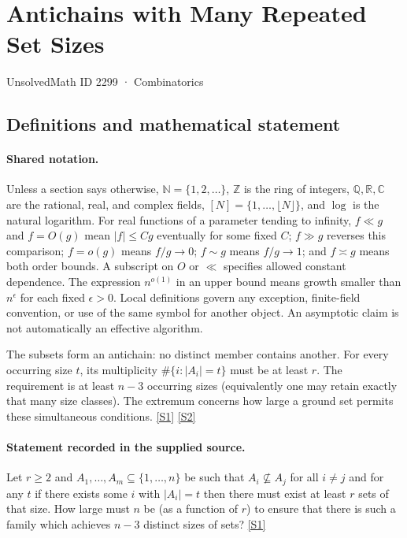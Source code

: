 \documentclass[11pt,a4paper]{article}
\newcommand{\N}{\mathbb{N}}
\newcommand{\Z}{\mathbb{Z}}
\newcommand{\Q}{\mathbb{Q}}
\newcommand{\R}{\mathbb{R}}
\newcommand{\C}{\mathbb{C}}
\newcommand{\sref}[2]{\hyperlink{source:#1:#2}{[S#2]}}
\begin{document}

\setcounter{section}{2298}

\section{Antichains with Many Repeated Set Sizes}\label{2299}

{\small\sffamily UnsolvedMath ID 2299 · Combinatorics}

\subsection{Definitions and mathematical statement}

\paragraph{Shared notation.}Unless a section says otherwise, $\N=\{1,2,\ldots\}$,
$\Z$ is the ring of integers, $\Q,\R,\C$ are the rational, real, and complex
fields, $[N]=\{1,\ldots,\lfloor N\rfloor\}$, and $\log$ is the natural
logarithm. For real functions of a parameter tending to infinity,
$f\ll g$ and $f=O(g)$ mean $|f|\leq Cg$ eventually for some fixed $C$;
$f\gg g$ reverses this comparison; $f=o(g)$ means $f/g\to0$;
$f\sim g$ means $f/g\to1$; and $f\asymp g$ means both order bounds.
A subscript on $O$ or $\ll$ specifies allowed constant dependence.
The expression $n^{o(1)}$ in an upper bound means growth smaller than
$n^\epsilon$ for each fixed $\epsilon>0$. Local definitions govern any
exception, finite-field convention, or use of the same symbol for another
object. An asymptotic claim is not automatically an effective algorithm.



The subsets form an antichain: no distinct member contains another. For every occurring size $t$, its multiplicity $\#\{i:|A_i|=t\}$ must be at least $r$. The requirement is at least $n-3$ occurring sizes (equivalently one may retain exactly that many size classes). The extremum concerns how large a ground set permits these simultaneous conditions. \sref{2299}{1} \sref{2299}{2}

\paragraph{Statement recorded in the supplied source.}
Let $r\geq 2$ and $A_1,\ldots,A_m\subseteq \{1,\ldots,n\}$ be such that $A_i\not\subseteq A_j$ for all $i\neq j$ and for any $t$ if there exists some $i$ with $\lvert A_i\rvert=t$ then there must exist at least $r$ sets of that size.
How large must $n$ be (as a function of $r$) to ensure that there is such a family which achieves $n-3$ distinct sizes of sets? \sref{2299}{1}
\end{document}
